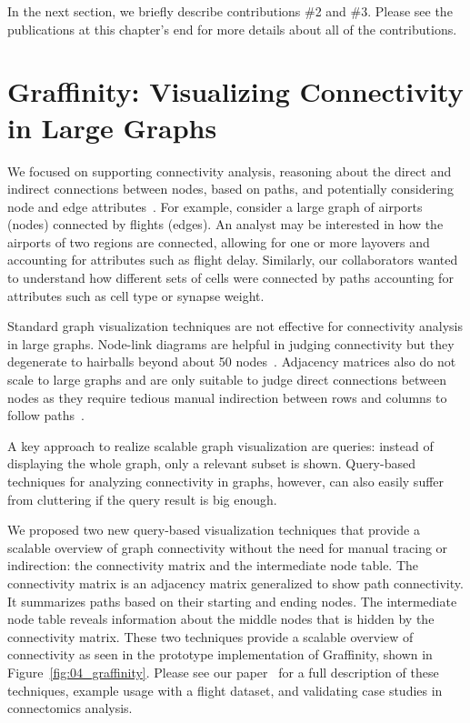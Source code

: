 In the next section, we briefly describe contributions \#2 and \#3. Please see the publications at this chapter's end for more details about all of the contributions.

\section{Graffinity: Visualizing Connectivity in Large Graphs}

We focused on supporting connectivity analysis, reasoning about the direct and indirect connections between nodes, based on paths, and potentially considering node and edge attributes~\cite{Lee2006}. For example, consider a large graph of airports (nodes) connected by flights (edges). An analyst may be interested in how the airports of two regions are connected, allowing for one or more layovers and accounting for attributes such as flight delay. Similarly, our collaborators wanted to understand how different sets of cells were connected by paths accounting for attributes such as cell type or synapse weight. 

Standard graph visualization techniques are not effective for connectivity analysis in large graphs. Node-link diagrams are helpful in judging connectivity but they degenerate to hairballs beyond about 50 nodes~\cite{Shneiderman2005}. Adjacency matrices also do not scale to large graphs and are only suitable to judge direct connections between nodes as they require tedious manual indirection between rows and columns to follow paths~\cite{Ghoniem2005}. 

A key approach to realize scalable graph visualization are queries: instead of displaying the whole graph, only a relevant subset is shown. Query-based techniques for analyzing connectivity in graphs, however, can also easily suffer from cluttering if the query result is big enough.

We proposed two new query-based visualization techniques that provide a scalable overview of graph connectivity without the need for manual tracing or indirection: the connectivity matrix and the intermediate node table. The connectivity matrix is an adjacency matrix generalized to show path connectivity. It summarizes paths based on their starting and ending nodes. The intermediate node table reveals information about the middle nodes that is hidden by the connectivity matrix. These two techniques provide a scalable overview of connectivity as seen in the prototype implementation of Graffinity, shown in Figure~\ref{fig:04_graffinity}. Please see our paper~\cite{Kerzner2017} for a full description of these techniques, example usage with a flight dataset, and validating case studies in connectomics analysis. 

